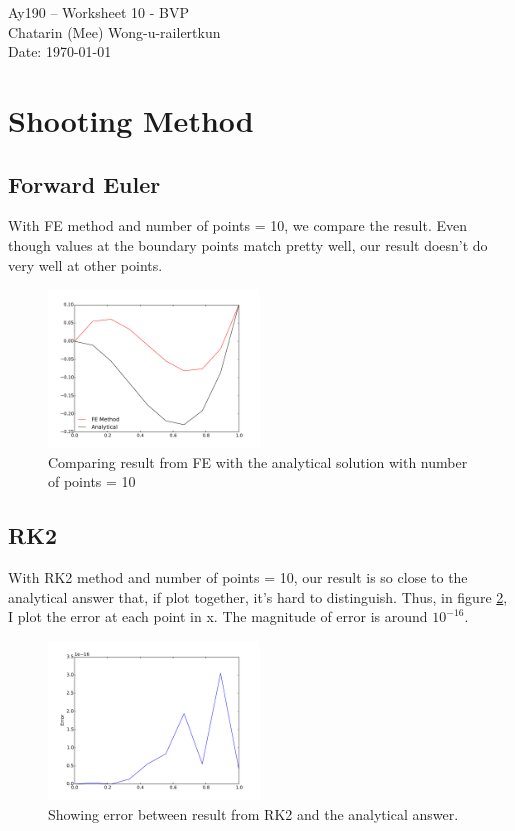 \documentclass[11pt,letterpaper]{article}
\begin{document}
\begin{center}
\Large
Ay190 -- Worksheet 10 - BVP \\    %
Chatarin (Mee) Wong-u-railertkun\\
Date: \today
\end{center}

\section{Shooting Method}

\subsection{Forward Euler}

With FE method and number of points = 10, we compare the result. Even though values at the boundary points match pretty well, our result doesn't do very well at other points.

\begin{figure}[h!]
	\centering
	\includegraphics[width=0.5\textwidth]{FEmethod}
	\caption{Comparing result from FE with the analytical solution with number of points = 10}
	\label{fig:FEmethod}
\end{figure}

\subsection{RK2}

With RK2 method and number of points = 10, our result is so close to the analytical answer that, if plot together, it's hard to distinguish. Thus, in figure \ref{fig:RK2method}, I plot the error at each point in x. The magnitude of error is around $10^{-16}$.

\begin{figure}[h!]
	\centering
	\includegraphics[width=0.5\textwidth]{RK2method}
	\caption{Showing error between result from RK2 and the analytical answer.}
	\label{fig:RK2method}
\end{figure}
\end{document}
